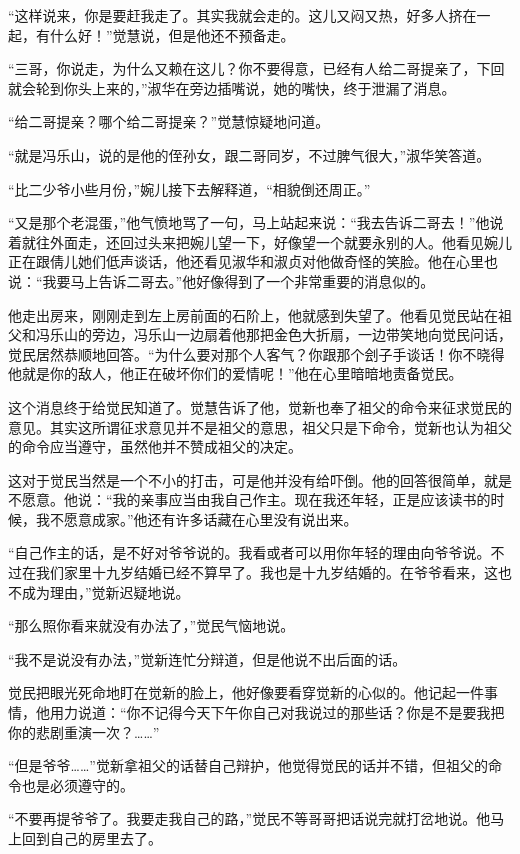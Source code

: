 \par “这样说来，你是要赶我走了。其实我就会走的。这儿又闷又热，好多人挤在一起，有什么好！”觉慧说，但是他还不预备走。
\par “三哥，你说走，为什么又赖在这儿？你不要得意，已经有人给二哥提亲了，下回就会轮到你头上来的，”淑华在旁边插嘴说，她的嘴快，终于泄漏了消息。
\par “给二哥提亲？哪个给二哥提亲？”觉慧惊疑地问道。
\par “就是冯乐山，说的是他的侄孙女，跟二哥同岁，不过脾气很大，”淑华笑答道。
\par “比二少爷小些月份，”婉儿接下去解释道，“相貌倒还周正。”
\par “又是那个老混蛋，”他气愤地骂了一句，马上站起来说：“我去告诉二哥去！”他说着就往外面走，还回过头来把婉儿望一下，好像望一个就要永别的人。他看见婉儿正在跟倩儿她们低声谈话，他还看见淑华和淑贞对他做奇怪的笑脸。他在心里也说：“我要马上告诉二哥去。”他好像得到了一个非常重要的消息似的。
\par 他走出房来，刚刚走到左上房前面的石阶上，他就感到失望了。他看见觉民站在祖父和冯乐山的旁边，冯乐山一边扇着他那把金色大折扇，一边带笑地向觉民问话，觉民居然恭顺地回答。“为什么要对那个人客气？你跟那个刽子手谈话！你不晓得他就是你的敌人，他正在破坏你们的爱情呢！”他在心里暗暗地责备觉民。
\par 这个消息终于给觉民知道了。觉慧告诉了他，觉新也奉了祖父的命令来征求觉民的意见。其实这所谓征求意见并不是祖父的意思，祖父只是下命令，觉新也认为祖父的命令应当遵守，虽然他并不赞成祖父的决定。
\par 这对于觉民当然是一个不小的打击，可是他并没有给吓倒。他的回答很简单，就是不愿意。他说：“我的亲事应当由我自己作主。现在我还年轻，正是应该读书的时候，我不愿意成家。”他还有许多话藏在心里没有说出来。
\par “自己作主的话，是不好对爷爷说的。我看或者可以用你年轻的理由向爷爷说。不过在我们家里十九岁结婚已经不算早了。我也是十九岁结婚的。在爷爷看来，这也不成为理由，”觉新迟疑地说。
\par “那么照你看来就没有办法了，”觉民气恼地说。
\par “我不是说没有办法，”觉新连忙分辩道，但是他说不出后面的话。
\par 觉民把眼光死命地盯在觉新的脸上，他好像要看穿觉新的心似的。他记起一件事情，他用力说道：“你不记得今天下午你自己对我说过的那些话？你是不是要我把你的悲剧重演一次？……”
\par “但是爷爷……”觉新拿祖父的话替自己辩护，他觉得觉民的话并不错，但祖父的命令也是必须遵守的。
\par “不要再提爷爷了。我要走我自己的路，”觉民不等哥哥把话说完就打岔地说。他马上回到自己的房里去了。

